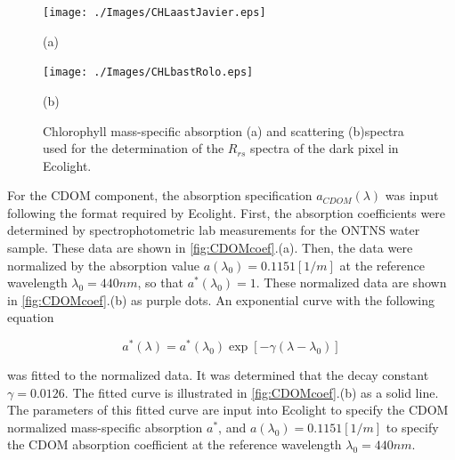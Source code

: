 \documentclass[onecolumn,3p,letterpaper]{elsarticle}
\begin{document}
\begin{figure}[htb]
  	\begin{minipage}[c]{0.48\linewidth}
    	\centering
  		\texttt{[image: ./Images/CHLaastJavier.eps]}
		\centerline{(a)}\medskip
  	\end{minipage}  
  	\hfill
  	\begin{minipage}[c]{0.48\linewidth}
    	\centering
  		\texttt{[image: ./Images/CHLbastRolo.eps]}
  		\centerline{(b)}\medskip
  	\end{minipage}	
  	\caption{Chlorophyll mass-specific absorption (a) and scattering (b)spectra used for the determination of the $R_{rs}$ spectra of the dark pixel in Ecolight. \label{fig:CHLcoef} } 
\end{figure}

For the CDOM component, the absorption specification $a_{CDOM}(\lambda)$ was input following the format required by Ecolight. First, the absorption coefficients were determined by spectrophotometric lab measurements for the ONTNS water sample. These data are shown in \autoref{fig:CDOMcoef}.(a). Then, the data were normalized by the absorption value $a(\lambda_0)=0.1151[1/m]$ at the reference wavelength $\lambda_0=440nm$, so that $a^*(\lambda_0)=1$. These normalized data are shown in \autoref{fig:CDOMcoef}.(b) as purple dots. An exponential curve with the following equation

\begin{equation}
	\label{eq:CDOMabs}
	a^*(\lambda)=a^*(\lambda_0)\exp{\left[-\gamma(\lambda-\lambda_0)\right]}
\end{equation}

\noindent was fitted to the normalized data. It was determined that the decay constant $\gamma=0.0126$. The fitted curve is illustrated in \autoref{fig:CDOMcoef}.(b) as a solid line. The parameters of this fitted curve are input into Ecolight to specify the CDOM normalized mass-specific absorption $a^*$, and $a(\lambda_0)=0.1151[1/m]$ to specify the CDOM absorption coefficient at the reference wavelength $\lambda_0=440nm$.
\end{document}
